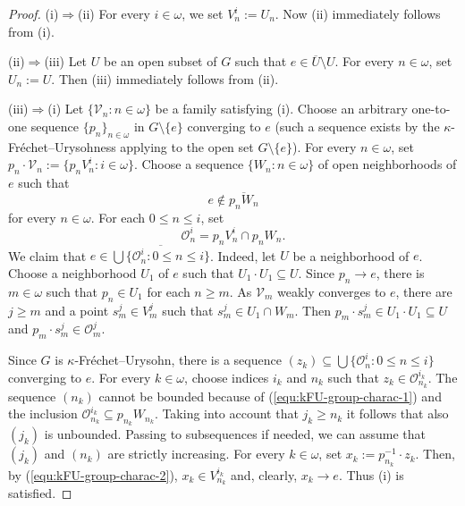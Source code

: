 \documentclass[10pt,a4paper]{amsart}
\newcommand{\Ra}{\Rightarrow}
\newcommand{\SM}{{\setminus}}
\newcommand{\w}{\omega}
\begin{document}
\begin{proof}
(i)$\Ra$(ii) For every $i\in \w$, we set $V^i_n:=U_n$. Now (ii) immediately follows from (i).
\smallskip

(ii)$\Ra$(iii) Let $U$ be an open subset of $G$ such that $e\in \overline{U}\SM U$. For every $n\in\w$, set $U_n:=U$. Then (iii) immediately follows from (ii).
\smallskip

(iii)$\Ra$(i) Let $\{\mathcal{V}_n: n\in \w\}$  be a family satisfying (i). Choose an arbitrary one-to-one sequence $\{p_n\}_{n\in\w}$ in $G\SM \{e\}$  converging to $e$ (such a sequence exists by the $\kappa$-Fr\'{e}chet--Urysohness applying to the open set $G\SM\{e\}$). For every $n\in\w$, set $p_n\cdot\mathcal{V}_n:=\{p_n V^i_n: i\in \w\}$. Choose a sequence $\{W_n: n\in \w\}$ of open neighborhoods of $e$ such that
\begin{equation} \label{equ:kFU-group-charac-1}
e\not\in \overline{p_n W_n}
\end{equation}
for every $n\in \w$. For each $0\leq n\leq i$, set
\begin{equation} \label{equ:kFU-group-charac-2}
\mathcal{O}^i_n=p_nV^i_n\cap p_nW_n.
\end{equation}
We claim that $e\in \overline{\bigcup \{\mathcal{O}^i_n: 0\leq n\leq i\}}$.  Indeed, let $U$ be a neighborhood of $e$. Choose a neighborhood $U_1$ of $e$ such that $U_1\cdot U_1\subseteq U$. Since $p_n\to e$, there is $m\in\w$ such that $p_n\in U_1$ for each $n\geq m$.  As $\mathcal{V}_m$ weakly converges to $e$, there are $j\geq m $ and a point $s_m^j\in V_m^j$ such that $s_m^j\in U_1\cap W_m$. Then $p_m\cdot s_m^j\in U_1\cdot U_1\subseteq U$ and $p_m\cdot s_m^j\in \mathcal{O}^j_m$.
\smallskip

Since $G$ is $\kappa$-Fr\'{e}chet--Urysohn, there is a sequence $(z_k)\subseteq \bigcup \{\mathcal{O}^i_n: 0\leq n\leq i\}$ converging to $e$. For every $k\in\w$, choose indices  $i_k$ and $n_k$ such that $z_k\in \mathcal{O}^{i_k}_{n_k}$. The sequence $(n_k)$ cannot be bounded because of (\ref{equ:kFU-group-charac-1}) and the inclusion $\mathcal{O}^{i_k}_{n_k} \subseteq p_{n_k}W_{n_k}$. Taking into account that $j_k\geq n_k$ it follows that also $(j_k)$ is unbounded. Passing to subsequences if needed, we can assume that $(j_k)$ and $(n_k)$ are strictly increasing.  For every $k\in\w$, set $x_k:= p_{n_k}^{-1}\cdot z_k $. Then, by (\ref{equ:kFU-group-charac-2}), $x_k\in V^{i_k}_{n_k}$ and, clearly, $x_k\to e$. Thus (i) is satisfied.
\end{proof}
\end{document}
